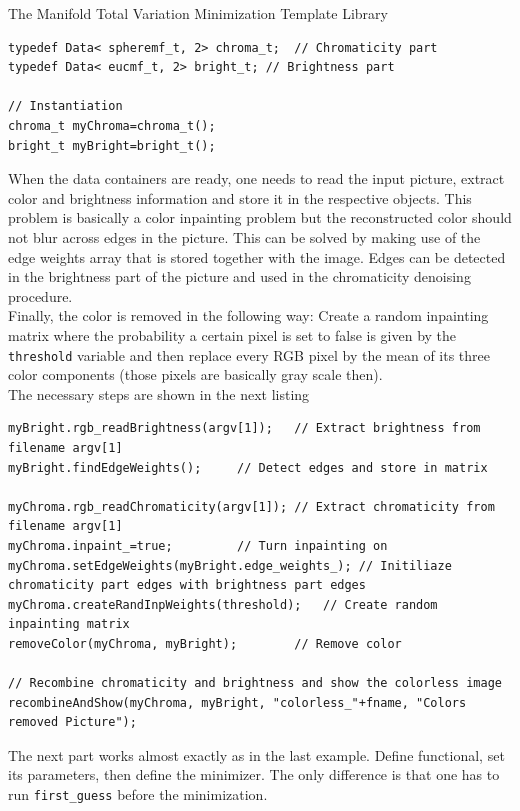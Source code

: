 \begin{chapter}{The Manifold Total Variation Minimization Template Library}
\begin{lstlisting}[label=code:tut2_mfdata,caption={Manifold and Data class type definitions and instantiation}]
typedef Data< spheremf_t, 2> chroma_t;	// Chromaticity part
typedef Data< eucmf_t, 2> bright_t;	// Brightness part

// Instantiation
chroma_t myChroma=chroma_t();
bright_t myBright=bright_t();
\end{lstlisting}

When the data containers are ready, one needs to read the input picture, extract color and brightness information and store it in the respective objects.
This problem is basically a color inpainting problem but the reconstructed color should not blur across edges in the picture. This can be solved
by making use of the edge weights array that is stored together with the image. Edges can be detected in the brightness part of the picture and used in the chromaticity denoising procedure.\\
Finally, the color is removed in the following way: Create a random inpainting matrix where the probability a certain pixel is set to false is given
by the \texttt{threshold} variable and then replace every RGB pixel by the mean of its three color components (those pixels are basically gray scale then).\\
The necessary steps are shown in the next listing

\cppinline
\begin{lstlisting}[label=code:tut2_edgeandcolorremoval,caption={Color and brightness input, edge detection and color removal}]
myBright.rgb_readBrightness(argv[1]);	// Extract brightness from filename argv[1]
myBright.findEdgeWeights();		// Detect edges and store in matrix

myChroma.rgb_readChromaticity(argv[1]); // Extract chromaticity from filename argv[1]
myChroma.inpaint_=true;			// Turn inpainting on
myChroma.setEdgeWeights(myBright.edge_weights_); // Initiliaze chromaticity part edges with brightness part edges
myChroma.createRandInpWeights(threshold);   // Create random inpainting matrix
removeColor(myChroma, myBright);	    // Remove color

// Recombine chromaticity and brightness and show the colorless image
recombineAndShow(myChroma, myBright, "colorless_"+fname, "Colors removed Picture");
\end{lstlisting}

The next part works almost exactly as in the last example. Define functional, set its parameters, then define the minimizer. The only difference is that
one has to run \texttt{first\_guess} before the minimization.\\


\end{chapter}
